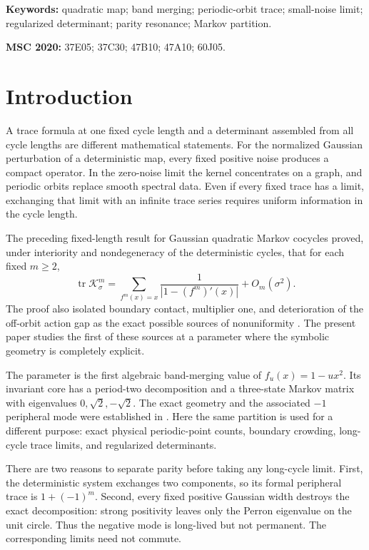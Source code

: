 \documentclass[11pt]{article}
\theoremstyle{definition}
\theoremstyle{remark}
\newcommand{\cK}{\mathcal K}
\newcommand{\tr}{\operatorname{tr}}
\begin{document}
\noindent\textbf{Keywords:} quadratic map; band merging; periodic-orbit
trace; small-noise limit; regularized determinant; parity resonance; Markov
partition.

\medskip
\noindent\textbf{MSC 2020:} 37E05; 37C30; 47B10; 47A10; 60J05.

\section{Introduction}

A trace formula at one fixed cycle length and a determinant assembled from
all cycle lengths are different mathematical statements.  For the normalized
Gaussian perturbation of a deterministic map, every fixed positive noise
produces a compact operator.  In the zero-noise limit the kernel concentrates
on a graph, and periodic orbits replace smooth spectral data.  Even if every
fixed trace has a limit, exchanging that limit with an infinite trace series
requires uniform information in the cycle length.

The preceding fixed-length result for Gaussian quadratic Markov cocycles
proved, under interiority and nondegeneracy of the deterministic cycles, that
for each fixed $m\ge2$,
\begin{equation}\label{eq:fixed-length-recalled}
 \tr\cK_\sigma^m
 =\sum_{f^m(x)=x}\frac{1}{|1-(f^m)'(x)|}+O_m(\sigma^2).
\end{equation}
The proof also isolated boundary contact, multiplier one, and deterioration
of the off-orbit action gap as the exact possible sources of nonuniformity
\citep{WangSmallNoise2026}.  The present paper studies the first of these
sources at a parameter where the symbolic geometry is completely explicit.

The parameter is the first algebraic band-merging value of
$f_u(x)=1-u x^2$.  Its invariant core has a period-two decomposition and a
three-state Markov matrix with eigenvalues $0,\sqrt2,-\sqrt2$.  The exact
geometry and the associated $-1$ peripheral mode were established in
\citet{WangParity2026}.  Here the same partition is used for a different
purpose: exact physical periodic-point counts, boundary crowding, long-cycle
trace limits, and regularized determinants.

There are two reasons to separate parity before taking any long-cycle limit.
First, the deterministic system exchanges two components, so its formal
peripheral trace is $1+(-1)^m$.  Second, every fixed positive Gaussian width
destroys the exact decomposition: strong positivity leaves only the Perron
eigenvalue on the unit circle.  Thus the negative mode is long-lived but not
permanent.  The corresponding limits need not commute.
\end{document}
